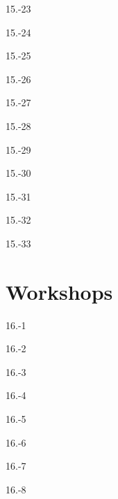 \begin{exsol@solution}{15.-23}
\end{exsol@solution}
\begin{exsol@solution}{15.-24}
\end{exsol@solution}
\begin{exsol@solution}{15.-25}
\end{exsol@solution}
\begin{exsol@solution}{15.-26}
\end{exsol@solution}
\begin{exsol@solution}{15.-27}
\end{exsol@solution}
\begin{exsol@solution}{15.-28}
\end{exsol@solution}
\begin{exsol@solution}{15.-29}
\end{exsol@solution}
\begin{exsol@solution}{15.-30}
\end{exsol@solution}
\begin{exsol@solution}{15.-31}
\end{exsol@solution}
\begin{exsol@solution}{15.-32}
\end{exsol@solution}
\begin{exsol@solution}{15.-33}
\end{exsol@solution}
\setcounter{chapter}{16}\chapter{Workshops}
\begin{exsol@solution}{16.-1}
\end{exsol@solution}
\begin{exsol@solution}{16.-2}
\end{exsol@solution}
\begin{exsol@solution}{16.-3}
\end{exsol@solution}
\begin{exsol@solution}{16.-4}
\end{exsol@solution}
\begin{exsol@solution}{16.-5}
\end{exsol@solution}
\begin{exsol@solution}{16.-6}
\end{exsol@solution}
\begin{exsol@solution}{16.-7}
\end{exsol@solution}
\begin{exsol@solution}{16.-8}
\end{exsol@solution}

